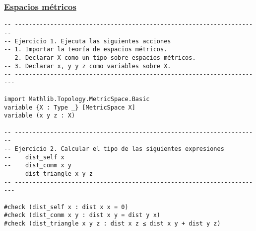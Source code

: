 \subsubsection{\href{./src/Basicos/Espacios\_metricos.lean}{Espacios métricos}}
\label{sec:orgc96d1e4}
\begin{verbatim}
-- ---------------------------------------------------------------------
-- Ejercicio 1. Ejecuta las siguientes acciones
-- 1. Importar la teoría de espacios métricos.
-- 2. Declarar X como un tipo sobre espacios métricos.
-- 3. Declarar x, y y z como variables sobre X.
-- ----------------------------------------------------------------------

import Mathlib.Topology.MetricSpace.Basic
variable {X : Type _} [MetricSpace X]
variable (x y z : X)

-- ---------------------------------------------------------------------
-- Ejercicio 2. Calcular el tipo de las siguientes expresiones
--    dist_self x
--    dist_comm x y
--    dist_triangle x y z
-- ----------------------------------------------------------------------

#check (dist_self x : dist x x = 0)
#check (dist_comm x y : dist x y = dist y x)
#check (dist_triangle x y z : dist x z ≤ dist x y + dist y z)
\end{verbatim}

